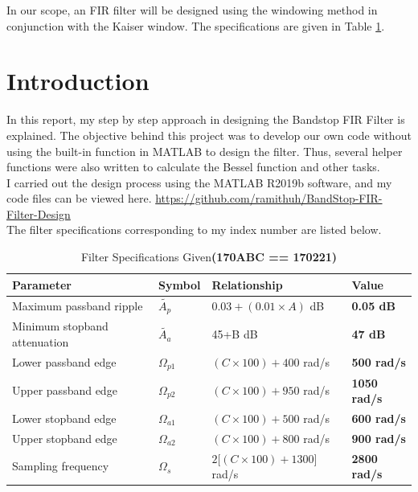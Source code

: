 \documentclass[11pt]{article}
\begin{document}
In our scope, an FIR filter will be designed using the windowing method in conjunction with the Kaiser window. The specifications are given in Table \ref{tab:filter-specs}.  \\


% 




\section{Introduction} 
In this report, my step by step approach in designing the Bandstop FIR Filter is explained. The objective behind this project was to develop our own code without using the built-in function in MATLAB to design the filter. 
Thus, several helper functions were also written to calculate the Bessel function and other tasks. 
\\I carried out the design process using the MATLAB R2019b software, and my code files can be viewed here.
\href{https://github.com/ramithuh/BandStop-FIR-Filter-Design}{https://github.com/ramithuh/BandStop-FIR-Filter-Design \faGithub}\\

The filter specifications corresponding to my index number are listed below.
\begin{table}[H]
    \centering
    \caption{Filter Specifications Given{\bf (170ABC == 170221)} }
    \label{tab:filter-specs}
    \begin{tabular}{@{}llll@{}}
    \toprule
    \textbf{Parameter}    & \textbf{Symbol}        & \textbf{Relationship}         & \textbf{Value}      \\ \midrule
    Maximum passband ripple & $\tilde{A_p}$    & $0.03 + (0.01 \times A)$ dB          & \textbf{0.05 dB}       \\
    Minimum stopband attenuation & $\tilde{A_a}$ & 45+B dB                       & \textbf{47 dB}      \\
    Lower passband edge& $\Omega_{p1}$        & $(C \times 100) + 400$ rad/s         & \textbf{500 rad/s}  \\
    Upper passband edge& $\Omega_{p2}$         & $(C \times 100) + 950$ rad/s        & \textbf{1050 rad/s} \\
    Lower stopband edge& $\Omega_{a1}$          & $(C \times 100) + 500$ rad/s         & \textbf{600 rad/s}  \\
    Upper stopband edge& $\Omega_{a2}$          & $(C \times 100) + 800$ rad/s         & \textbf{900 rad/s}  \\
    Sampling frequency&  $\Omega_{s}$          & $2{[}(C \times 100) + 1300{]}$ rad/s & \textbf{2800 rad/s} \\ \bottomrule
    \end{tabular}
    \end{table}
\end{document}
